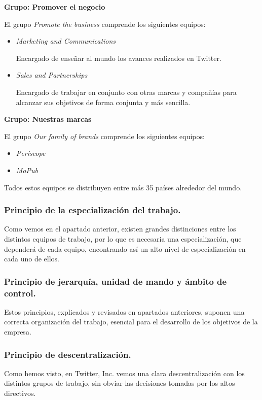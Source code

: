 \textbf{Grupo: Promover el negocio}

El grupo \textit{Promote the business} comprende los siguientes equipos:

\begin{itemize}

\item \textit{Marketing and Communications}

Encargado de enseñar al mundo los avances realizados en Twitter.

\item \textit{Sales and Partnerships}

Encargado de trabajar en conjunto con otras marcas y compañías para alcanzar sus objetivos de forma conjunta y más sencilla.

\end{itemize}

\textbf{Grupo: Nuestras marcas}

El grupo \textit{Our family of brands} comprende los siguientes equipos:

\begin{itemize}

\item \textit{Periscope}
\item \textit{MoPub}\\

\end{itemize}



Todos estos equipos se distribuyen entre más 35 países alrededor del mundo.

\subsubsection{Principio de la especialización del trabajo.}

Como vemos en el apartado anterior, existen grandes distinciones entre los distintos equipos de trabajo, por lo que es necesaria una especialización, que dependerá de cada equipo, encontrando así un alto nivel de especialización en cada uno de ellos.

\subsubsection{Principio de jerarquía, unidad de mando y ámbito de control.}

Estos principios, explicados y revisados en apartados anteriores, suponen una correcta organización del trabajo, esencial para el desarrollo de los objetivos de la empresa.

\subsubsection{Principio de descentralización.}

Como hemos visto, en Twitter, Inc. vemos una clara descentralización con los distintos grupos de trabajo, sin obviar las decisiones tomadas por los altos directivos.